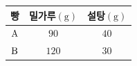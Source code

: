 \begin{tabular}{|c|c|c|}
\hline
\rule{0pt}{2.9ex}빵 & 밀가루$(\mathrm{g})$ & 설탕$(\mathrm{g})$ \\[0.5ex]
\hline
\rule{0pt}{2.9ex}$\mathrm{A}$ & $90$ & $40$ \\[0.5ex]
\hline
\rule{0pt}{2.9ex}$\mathrm{B}$ & $120$ & $30$ \\[0.5ex]
\hline
\end{tabular}
